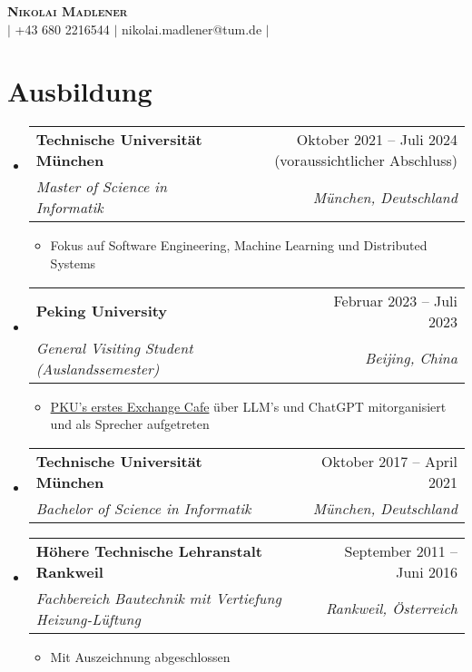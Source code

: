 \documentclass[letterpaper,11pt]{article}
\makeatletter
\newcommand{\resumeItem}[1]{
  \item\small{
    {#1 \vspace{-2pt}}
  }
}
\newcommand{\resumeSubheading}[4]{
  \vspace{-2pt}\item
    \begin{tabular*}{0.97\textwidth}[t]{l@{\extracolsep{\fill}}r}
      \textbf{#1} & #2 \\
      \textit{\small#3} & \textit{\small #4} \\
    \end{tabular*}\vspace{-7pt}
}
\newcommand{\resumeSubHeadingListStart}{\begin{itemize}[leftmargin=0.15in, label={}]}
\newcommand{\resumeSubHeadingListEnd}{\end{itemize}}
\newcommand{\resumeItemListStart}{\begin{itemize}}
\newcommand{\resumeItemListEnd}{\end{itemize}\vspace{-5pt}}
\makeatother
\begin{document}

\begin{center}
  \textbf{\Huge \scshape Nikolai Madlener} \\ \vspace{1pt}
  \href{https://www.linkedin.com/in/nikolai-madlener-163b14169/}{\faLinkedinSquare} $|$
  \small +43 680 2216544 $|$ {{nikolai.madlener@tum.de}} $|$
  \href{https://github.com/NikolaiMadlener}{\faGithub}
  
\end{center}


\section{Ausbildung}  
\resumeSubHeadingListStart
  \resumeSubheading
      {Technische Universität München}{Oktober 2021 -- Juli 2024 (voraussichtlicher Abschluss)}
      {Master of Science in Informatik}{München, Deutschland}
      \resumeItemListStart
        \resumeItem{Fokus auf Software Engineering, Machine Learning und Distributed Systems}
      \resumeItemListEnd
    \resumeSubheading
      {Peking University}{Februar 2023 -- Juli 2023}
      {General Visiting Student (Auslandssemester)}{Beijing, China}
      \resumeItemListStart
        \resumeItem{\href{https://newsen.pku.edu.cn/news_events/news/campus/13276.html}{PKU's erstes Exchange Cafe} über LLM's und ChatGPT mitorganisiert und als Sprecher aufgetreten}
      \resumeItemListEnd

    \resumeSubheading
      {Technische Universität München}{Oktober 2017 -- April 2021}
      {Bachelor of Science in Informatik}{München, Deutschland}
    \resumeSubheading
      {Höhere Technische Lehranstalt Rankweil}{September 2011 -- Juni 2016}
      {Fachbereich Bautechnik mit Vertiefung Heizung-Lüftung}{Rankweil, Österreich}
      \resumeItemListStart
      \resumeItem{Mit Auszeichnung abgeschlossen}
      \resumeItemListEnd
  \resumeSubHeadingListEnd
\end{document}
